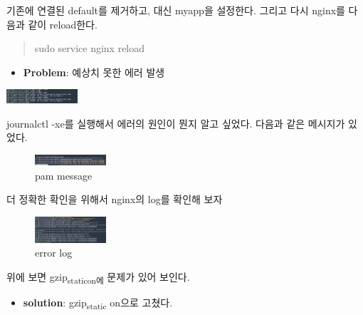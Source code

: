 \documentclass[11pt]{article}
\begin{document}
기존에 연결된 default를 제거하고, 대신 myapp을 설정한다.
그리고 다시 nginx를 다음과 같이 reload한다.
\begin{quote}
sudo service nginx reload
\end{quote}

\begin{itemize}
\item \textbf{Problem}: 예상치 못한 에러 발생
\end{itemize}
\begin{center}
\includegraphics[width=100px]{./img/nginx4.png}
\label{orgf47f87b}
\end{center}
journalctl -xe를 실행해서 에러의 원인이 뭔지 알고 싶었다. 다음과 같은 메시지가 있었다.
\begin{figure}[htbp]
\centering
\includegraphics[width=100px]{./img/pam.png}
\caption{\label{fig:org6547a06}pam message}
\end{figure}
더 정확한 확인을 위해서 nginx의 log를 확인해 보자
\begin{figure}[htbp]
\centering
\includegraphics[width=100px]{./img/errorlog.png}
\caption{\label{fig:org3721e5d}error log}
\end{figure}
위에 보면 gzip\textsubscript{static}\textsubscript{on에} 문제가 있어 보인다.

\begin{itemize}
\item \textbf{solution}: gzip\textsubscript{static} on으로 고쳤다.
\end{itemize}
\end{document}
